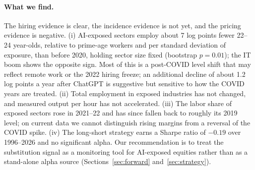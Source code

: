 \paragraph{What we find.} The hiring evidence is clear, the incidence evidence is not yet, and the pricing evidence is negative. (i) AI-exposed sectors employ about 7 log points fewer 22--24 year-olds, relative to prime-age workers and per standard deviation of exposure, than before 2020, holding sector size fixed (bootstrap $p=0.01$); the IT boom shows the opposite sign. Most of this is a post-COVID level shift that may reflect remote work or the 2022 hiring freeze; an additional decline of about 1.2 log points a year after ChatGPT is suggestive but sensitive to how the COVID years are treated. (ii) Total employment in exposed industries has not changed, and measured output per hour has not accelerated. (iii) The labor share of exposed sectors rose in 2021--22 and has since fallen back to roughly its 2019 level; on current data we cannot distinguish rising margins from a reversal of the COVID spike. (iv) The long-short strategy earns a Sharpe ratio of $-0.19$ over 1996--2026 and no significant alpha. Our recommendation is to treat the substitution signal as a monitoring tool for AI-exposed equities rather than as a stand-alone alpha source (Sections~\ref{sec:forward} and~\ref{sec:strategy}).
